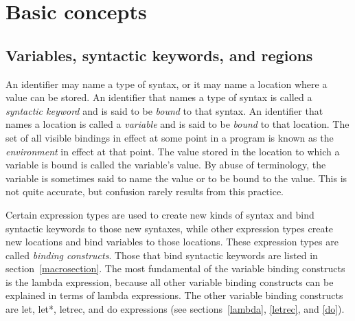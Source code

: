 \chapter{Basic concepts}
\label{basicchapter}

\section{Variables, syntactic keywords, and regions}
\label{specialformsection}
\label{variablesection}

An identifier may name a type of syntax, or it may name
a location where a value can be stored.  An identifier that names a type
of syntax is called a {\em syntactic keyword}
and is said to be {\em bound} to that syntax.  An identifier that names a
location is called a {\em variable} and is said to be
{\em bound} to that location.  The set of all visible
bindings in effect at some point in a program is
known as the {\em environment} in effect at that point.  The value
stored in the location to which a variable is bound is called the
variable's value.  By abuse of terminology, the variable is sometimes
said to name the value or to be bound to the value.  This is not quite
accurate, but confusion rarely results from this practice.



\vest Certain expression types are used to create new kinds of syntax
and bind syntactic keywords to those new syntaxes, while other
expression types create new locations and bind variables to those
locations.  These expression types are called {\em binding constructs}.
Those that bind syntactic keywords are listed in section~\ref{macrosection}.
The most fundamental of the variable binding constructs is the
{\cf lambda} expression, because all other variable binding constructs
can be explained in terms of {\cf lambda} expressions.  The other
variable binding constructs are {\cf let}, {\cf let*}, {\cf letrec},
and {\cf do} expressions (see sections~\ref{lambda}, \ref{letrec}, and
\ref{do}).


